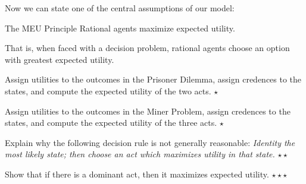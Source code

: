 Now we can state one of the central assumptions of our model:

\begin{genericthm}{The MEU Principle}
  Rational agents maximize expected utility. 
\end{genericthm}
%
That is, when faced with a decision problem, rational agents choose an
option with greatest expected utility.


\begin{exercise}
  Assign utilities to the outcomes in the Prisoner Dilemma, assign
  credences to the states, and compute the expected utility of the two
  acts. $\star$
\end{exercise}

\begin{exercise}
  Assign utilities to the outcomes in the Miner Problem, assign
  credences to the states, and compute the expected utility of the
  three acts. $\star$
\end{exercise}

\begin{exercise}
  Explain why the following decision rule is not generally reasonable:
  \emph{Identity the most likely state; then choose an act which
    maximizes utility in that state.} $\star\star$
\end{exercise}

\begin{exercise}
  Show that if there is a dominant act, then it maximizes
  expected utility. $\star\star\star$
\end{exercise}


